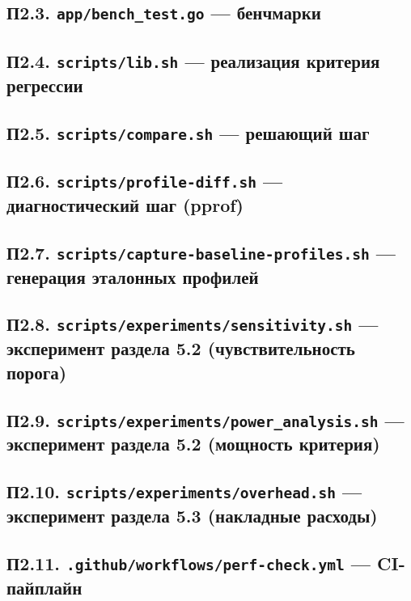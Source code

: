 \documentclass[12pt,a4paper]{article}
\numberwithin{equation}{section}
\begin{document}
\subsection*{П2.3. \texttt{app/\allowbreak bench\_test.go} --- бенчмарки}


\subsection*{П2.4. \texttt{scripts/\allowbreak lib.sh} --- реализация критерия регрессии}


\subsection*{П2.5. \texttt{scripts/\allowbreak compare.sh} --- решающий шаг}


\subsection*{П2.6. \texttt{scripts/\allowbreak profile-diff.sh} --- диагностический шаг (pprof)}


\subsection*{П2.7. \texttt{scripts/\allowbreak capture-baseline-profiles.sh} --- генерация эталонных профилей}


\subsection*{П2.8. \texttt{scripts/\allowbreak experiments/\allowbreak sensitivity.sh} --- эксперимент раздела 5.2 (чувствительность порога)}


\subsection*{П2.9. \texttt{scripts/\allowbreak experiments/\allowbreak power\_analysis.sh} --- эксперимент раздела 5.2 (мощность критерия)}


\subsection*{П2.10. \texttt{scripts/\allowbreak experiments/\allowbreak overhead.sh} --- эксперимент раздела 5.3 (накладные расходы)}


\subsection*{П2.11. \texttt{.github/\allowbreak workflows/\allowbreak perf-check.yml} --- CI-пайплайн}

\end{document}
